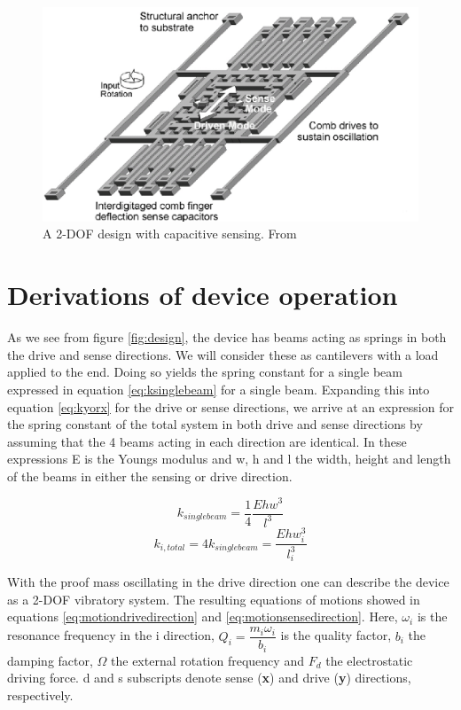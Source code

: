 \documentclass[12pt,a4paper,titlepage]{article}
\begin{document}
\begin{spacing}{1.1}
\begin{figure}[htb]
\centering
\includegraphics[width=0.8\linewidth]{capadesign}
\caption{A 2-DOF design with capacitive sensing. From \cite{Clark96}}
\label{fig:capadesign}
\end{figure}
\section{Derivations of device operation}
As we see from figure \ref{fig:design}, the device has beams acting as springs in both the drive and sense directions. We will consider these as cantilevers with a load applied to the end. Doing so yields the spring constant for a single beam expressed in equation \ref{eq:ksinglebeam} for a single beam. Expanding this into equation \ref{eq:kyorx} for the drive or sense directions, we arrive at an expression for the spring constant of the total system in both drive and sense directions by assuming that the 4 beams acting in each direction are identical. In these expressions E is the Youngs modulus and w, h and l the width, height and length of the beams in either the sensing or drive direction.

\begin{equation}
k_{single beam} = \dfrac{1}{4} \dfrac{E h w^3}{l^3}
\label{eq:ksinglebeam}
\end{equation}
\begin{equation}
k_{i,total} = 4 k_{single beam} = \dfrac{E h w_i^3}{l_i^3}
\label{eq:kyorx}
\end{equation}

With the proof mass oscillating in the drive direction one can describe the device as a 2-DOF vibratory system. The resulting equations of motions showed in equations \ref{eq:motiondrivedirection} and \ref{eq:motionsensedirection}. Here, $\omega_i$ is the resonance frequency in the i direction, $Q_i = \dfrac{m_i \omega_i}{b_i}$ is the quality factor, $b_i$ the damping factor, $\Omega$ the external rotation frequency and $F_d$ the electrostatic driving force. d and s subscripts denote sense (\textbf{x}) and drive (\textbf{y}) directions, respectively.


\end{spacing}
\end{document}
